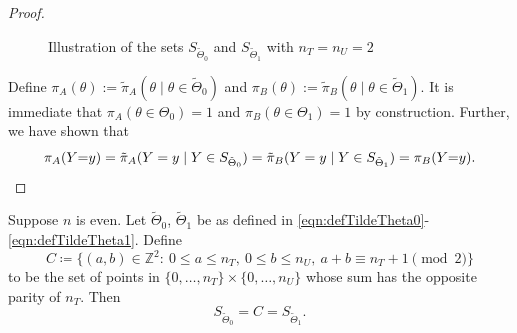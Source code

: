 \documentclass[12pt,reqno]{amsart}
\begin{document}
\begin{proof}
\begin{figure}[!ht]

    \caption{Illustration of the sets $S_{\tilde{\Theta}_0}$ and $S_{\tilde{\Theta}_1}$ with $n_T = n_U = 2$}
    \label{fig:supports-same}
\end{figure}

Define $\pi_A(\theta) := \tilde{\pi}_A(\theta \mid \theta \in \tilde{\Theta}_0)$ and
$\pi_B(\theta) := \tilde{\pi}_B(\theta \mid \theta \in \tilde{\Theta}_1)$. It is immediate
that $\pi_A(\theta \in \Theta_0) = 1$ and $\pi_B(\theta \in \Theta_1) = 1$ by
construction. Further, we have shown that \[
\pi_A(Y{=}y) = \tilde \pi_A(Y=y \mid Y \in S_{\tilde{\Theta}_0}) = \tilde \pi_B(Y=y \mid Y
\in S_{\tilde{\Theta}_1}) = \pi_B(Y{=}y) .
\qedhere
\]
\end{proof}


\begin{lem}
\label{lem:equivsupports}
Suppose $n$ is even. Let $\tilde{\Theta}_0$, $\tilde{\Theta}_1$ be as defined in \eqref{eqn:defTildeTheta0}-\eqref{eqn:defTildeTheta1}. Define
\[
C\coloneqq\bigl\{(a,b)\in\mathbb{Z}^2:\ 0\le a\le n_T,\ 0\le b\le n_U,\ a+b\equiv n_T+1\pmod 2\bigr\}
\]
to be the set of points in $\{0,\ldots,n_T\} \times \{0,\ldots,n_U\}$ whose sum has the opposite parity of $n_T$. Then
\[
S_{\tilde{\Theta}_0} = C =S_{\tilde{\Theta}_1}.
\]
\end{lem}
\end{document}

